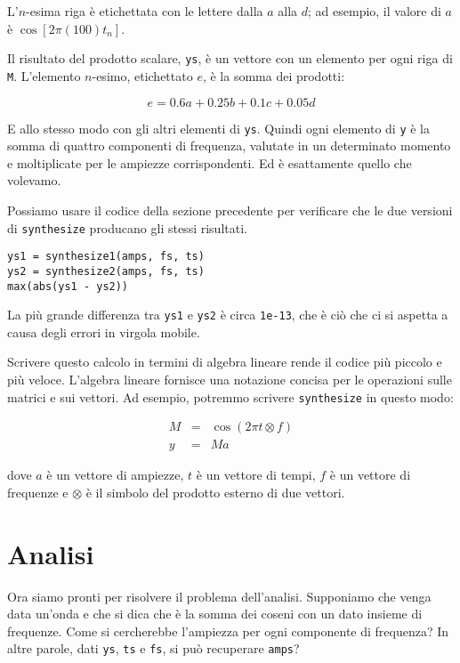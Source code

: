 \documentclass[12pt,a4paper]{book}
\begin{document}
L'$n$-esima riga è etichettata con le lettere dalla $a$ alla $d$; ad esempio, il valore di $a$ è $\cos [2 \pi (100) t_n]$.

Il risultato del prodotto scalare, {\tt ys}, è un vettore con un elemento per ogni riga di {\tt M}. L'elemento $n$-esimo, etichettato $e$, è la somma dei prodotti:

%
\[ e = 0.6 a + 0.25 b + 0.1 c + 0.05 d \] 

%
E allo stesso modo con gli altri elementi di {\tt ys}. Quindi ogni elemento di {\tt y} è la somma di quattro componenti di frequenza, valutate in un determinato momento e moltiplicate per le ampiezze corrispondenti. Ed è esattamente quello che volevamo.

Possiamo usare il codice della sezione precedente per verificare che le due versioni di {\tt synthesize} producano gli stessi risultati.

\begin{verbatim} 
ys1 = synthesize1(amps, fs, ts)
ys2 = synthesize2(amps, fs, ts)
max(abs(ys1 - ys2))
 \end{verbatim} 

La più grande differenza tra {\tt ys1} e {\tt ys2} è circa {\tt 1e-13}, che è ciò che ci si aspetta a causa degli errori in virgola mobile.

Scrivere questo calcolo in termini di algebra lineare rende il codice più piccolo e più veloce. L'algebra lineare fornisce una notazione concisa per le operazioni sulle matrici e sui vettori. Ad esempio, potremmo scrivere {\tt synthesize} in questo modo:

%
\begin{eqnarray*} M&=& \cos (2 \pi t \otimes f) \\ y&=&M a \end{eqnarray*} 

%
dove $a$ è un vettore di ampiezze, $t$ è un vettore di tempi, $f$ è un vettore di frequenze e $\otimes$ è il simbolo del prodotto esterno di due vettori.

\section{Analisi} \label{analysis} 

Ora siamo pronti per risolvere il problema dell'analisi. Supponiamo che venga data un'onda e che si dica che è la somma dei coseni con un dato insieme di frequenze. Come si cercherebbe l'ampiezza per ogni componente di frequenza? In altre parole, dati {\tt ys}, {\tt ts} e {\tt fs}, si può recuperare {\tt amps}?
\end{document}
